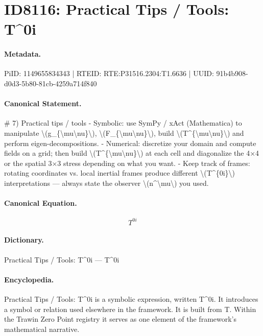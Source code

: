 \section*{ID8116: Practical Tips / Tools: T\textasciicircum{}0i}
\paragraph{Metadata.}
PiID: 1149655834343 | RTEID: RTE:P31516.2304:T1.6636 | UUID: 91b4b908-d0d3-5b80-81cb-4259a714f840

\paragraph{Canonical Statement.}
\# 7) Practical tips / tools - Symbolic: use SymPy / xAct (Mathematica) to manipulate \textbackslash{}(g\_\{\textbackslash{}mu\textbackslash{}nu\}\textbackslash{}), \textbackslash{}(F\_\{\textbackslash{}mu\textbackslash{}nu\}\textbackslash{}), build \textbackslash{}(T\textasciicircum{}\{\textbackslash{}mu\textbackslash{}nu\}\textbackslash{}) and perform eigen-decompositions. - Numerical: discretize your domain and compute fields on a grid; then build \textbackslash{}(T\textasciicircum{}\{\textbackslash{}mu\textbackslash{}nu\}\textbackslash{}) at each cell and diagonalize the 4×4 or the spatial 3×3 stress depending on what you want. - Keep track of frames: rotating coordinates vs. local inertial frames produce different \textbackslash{}(T\textasciicircum{}\{0i\}\textbackslash{}) interpretations — always state the observer \textbackslash{}(n\textasciicircum{}\textbackslash{}mu\textbackslash{}) you used.

\paragraph{Canonical Equation.}
\[
T^{0i}
\]

\paragraph{Dictionary.}
Practical Tips / Tools: T\textasciicircum{}0i — T\textasciicircum{}0i

\paragraph{Encyclopedia.}
Practical Tips / Tools: T\textasciicircum{}0i is a symbolic expression, written T\textasciicircum{}0i. It introduces a symbol or relation used elsewhere in the framework. It is built from T. Within the Trawin Zero Point registry it serves as one element of the framework's mathematical narrative.
